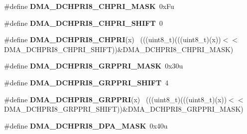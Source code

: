 \begin{DoxyCompactItemize}
\item 
\hypertarget{group___d_m_a___register___masks_ga44efc2d24b92142a4be64cae219e4313}{}\#define {\bfseries D\+M\+A\+\_\+\+D\+C\+H\+P\+R\+I8\+\_\+\+C\+H\+P\+R\+I\+\_\+\+M\+A\+S\+K}~0x\+Fu\label{group___d_m_a___register___masks_ga44efc2d24b92142a4be64cae219e4313}

\item 
\hypertarget{group___d_m_a___register___masks_gae9ee24ab908f6a1a3551e5ae4bf0bcad}{}\#define {\bfseries D\+M\+A\+\_\+\+D\+C\+H\+P\+R\+I8\+\_\+\+C\+H\+P\+R\+I\+\_\+\+S\+H\+I\+F\+T}~0\label{group___d_m_a___register___masks_gae9ee24ab908f6a1a3551e5ae4bf0bcad}

\item 
\hypertarget{group___d_m_a___register___masks_ga7ce1a655af27c40634238577889da91c}{}\#define {\bfseries D\+M\+A\+\_\+\+D\+C\+H\+P\+R\+I8\+\_\+\+C\+H\+P\+R\+I}(x)                                      ~(((uint8\+\_\+t)(((uint8\+\_\+t)(x))$<$$<$D\+M\+A\+\_\+\+D\+C\+H\+P\+R\+I8\+\_\+\+C\+H\+P\+R\+I\+\_\+\+S\+H\+I\+F\+T))\&D\+M\+A\+\_\+\+D\+C\+H\+P\+R\+I8\+\_\+\+C\+H\+P\+R\+I\+\_\+\+M\+A\+S\+K)\label{group___d_m_a___register___masks_ga7ce1a655af27c40634238577889da91c}

\item 
\hypertarget{group___d_m_a___register___masks_gac976aaaffb445309d7e86a0a00a2cdba}{}\#define {\bfseries D\+M\+A\+\_\+\+D\+C\+H\+P\+R\+I8\+\_\+\+G\+R\+P\+P\+R\+I\+\_\+\+M\+A\+S\+K}~0x30u\label{group___d_m_a___register___masks_gac976aaaffb445309d7e86a0a00a2cdba}

\item 
\hypertarget{group___d_m_a___register___masks_ga4f9a216879c474a1677b1b364879ede7}{}\#define {\bfseries D\+M\+A\+\_\+\+D\+C\+H\+P\+R\+I8\+\_\+\+G\+R\+P\+P\+R\+I\+\_\+\+S\+H\+I\+F\+T}~4\label{group___d_m_a___register___masks_ga4f9a216879c474a1677b1b364879ede7}

\item 
\hypertarget{group___d_m_a___register___masks_ga10756d4b5f5d9782da3457799fd7711b}{}\#define {\bfseries D\+M\+A\+\_\+\+D\+C\+H\+P\+R\+I8\+\_\+\+G\+R\+P\+P\+R\+I}(x)                                    ~(((uint8\+\_\+t)(((uint8\+\_\+t)(x))$<$$<$D\+M\+A\+\_\+\+D\+C\+H\+P\+R\+I8\+\_\+\+G\+R\+P\+P\+R\+I\+\_\+\+S\+H\+I\+F\+T))\&D\+M\+A\+\_\+\+D\+C\+H\+P\+R\+I8\+\_\+\+G\+R\+P\+P\+R\+I\+\_\+\+M\+A\+S\+K)\label{group___d_m_a___register___masks_ga10756d4b5f5d9782da3457799fd7711b}

\item 
\hypertarget{group___d_m_a___register___masks_ga65d73b58fdc371391eba07e59bec1292}{}\#define {\bfseries D\+M\+A\+\_\+\+D\+C\+H\+P\+R\+I8\+\_\+\+D\+P\+A\+\_\+\+M\+A\+S\+K}~0x40u\label{group___d_m_a___register___masks_ga65d73b58fdc371391eba07e59bec1292}


\end{DoxyCompactItemize}
